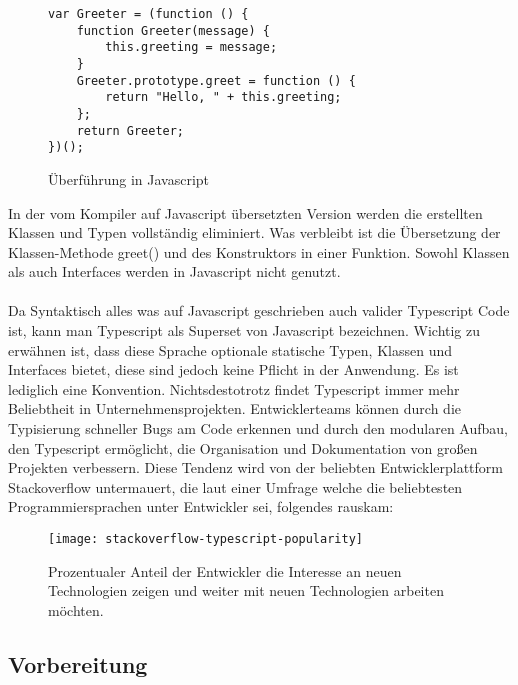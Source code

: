 \begin{figure}[t]
\begin{lstlisting}
var Greeter = (function () {
    function Greeter(message) {
        this.greeting = message;
    }
    Greeter.prototype.greet = function () {
        return "Hello, " + this.greeting;
    };
    return Greeter;
})(); 
\end{lstlisting}
\caption{Überführung in Javascript \cite{typescript-example}}
\end{figure}
In der vom Kompiler auf Javascript übersetzten Version werden die erstellten Klassen und Typen vollständig eliminiert. Was verbleibt ist die Übersetzung der Klassen-Methode greet() und des Konstruktors in einer Funktion. Sowohl Klassen als auch Interfaces werden in Javascript nicht genutzt.
\\\\
Da Syntaktisch alles was auf Javascript geschrieben auch valider Typescript Code ist, kann man Typescript als Superset von Javascript bezeichnen.
Wichtig zu erwähnen ist, dass diese Sprache optionale statische Typen, Klassen und Interfaces bietet, diese sind jedoch keine Pflicht in der Anwendung. Es ist lediglich eine Konvention.
Nichtsdestotrotz findet Typescript immer mehr Beliebtheit in Unternehmensprojekten. Entwicklerteams können durch die Typisierung schneller Bugs am Code erkennen und durch den modularen Aufbau, den Typescript ermöglicht, die Organisation und Dokumentation von großen Projekten verbessern. Diese Tendenz wird von der beliebten Entwicklerplattform Stackoverflow untermauert, die laut einer Umfrage welche die beliebtesten Programmiersprachen unter Entwickler sei, folgendes rauskam:

\begin{figure}[H]
\centering
\texttt{[image: stackoverflow-typescript-popularity]}
\caption{Prozentualer Anteil der Entwickler die Interesse an neuen Technologien zeigen und weiter mit neuen Technologien arbeiten möchten. \cite{typescript-survey}}
\end{figure}

\subsection{Vorbereitung}
